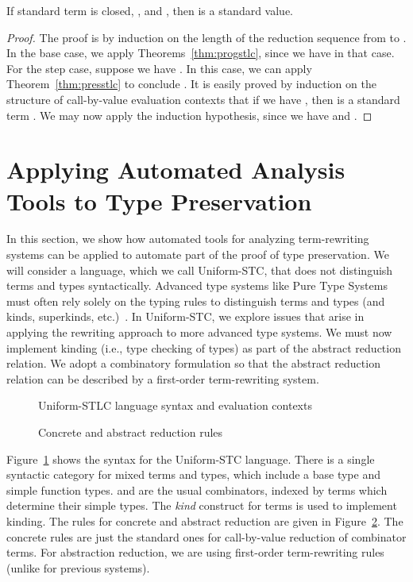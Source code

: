 \documentclass{LMCS}
\begin{document}
\begin{thm}
\label{thm:safety}
If standard term  is closed, , and , then  is a standard value.
\end{thm}
\begin{proof} The proof is by induction on the length of the reduction
sequence from  to .  In the base case, we apply
Theorems~\ref{thm:progstlc}, since we have  in that
case.  For the step case, suppose we have .  In this case, we can apply Theorem~\ref{thm:presstlc} to
conclude .  It is easily proved by induction on the
structure of call-by-value evaluation contexts  that if we have
, then  is a standard term .  We may now apply the
induction hypothesis, since we have  and . \end{proof}

\section{Applying Automated Analysis Tools to Type Preservation}
\label{sec:unistc}

In this section, we show how automated tools for analyzing
term-rewriting systems can be applied to automate part of the proof of
type preservation.  We will consider a language, which we call
Uniform-STC, that does not distinguish terms and types syntactically.
Advanced type systems like Pure Type Systems must often rely solely on
the typing rules to distinguish terms and types (and kinds,
superkinds, etc.)~\cite{B92}.  In Uniform-STC, we explore issues that
arise in applying the rewriting approach to more advanced type
systems.  We must now implement kinding (i.e., type checking of types)
as part of the abstract reduction relation.  We adopt a combinatory
formulation so that the abstract reduction relation can be described
by a first-order term-rewriting system.

\begin{figure}[t]
  \centering

  \caption{Uniform-STLC language syntax and evaluation contexts}
  \label{fig:unified-syntax}
\end{figure}


\begin{figure}[t]

  \caption{Concrete and abstract reduction rules}
  \label{fig:uni-rules}
\end{figure}

Figure~\ref{fig:unified-syntax} shows the syntax for the Uniform-STC
language.  There is a single syntactic category  for mixed terms
and types, which include a base type  and simple function types.
 and  are the
usual combinators, indexed by terms which determine their simple
types.  The \textit{kind} construct for terms is used to implement
kinding.  The rules for concrete and abstract reduction are given in
Figure~\ref{fig:uni-rules}.  The concrete rules are just the standard
ones for call-by-value reduction of combinator terms.  For abstraction
reduction, we are using first-order term-rewriting rules (unlike for
previous systems).  
\end{document}
